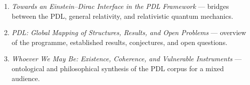 \documentclass[12pt, a4paper, openright]{book}
\begin{document}
\begin{enumerate}
\item \textit{Towards an Einstein--Dirac Interface in the PDL Framework} — bridges between the PDL, general relativity, and relativistic quantum mechanics.

\item \textit{PDL: Global Mapping of Structures, Results, and Open Problems} — overview of the programme, established results, conjectures, and open questions.

\item \textit{Whoever We May Be: Existence, Coherence, and Vulnerable Instruments} — ontological and philosophical synthesis of the PDL corpus for a mixed audience.

\end{enumerate}

\end{document}
